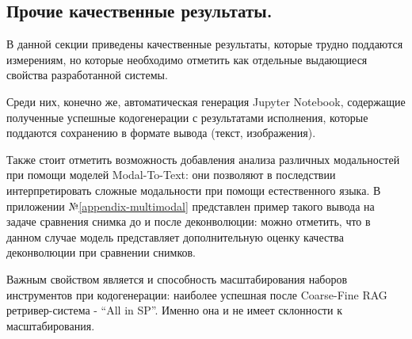 \subsection{Прочие качественные результаты.} \label{ch4:sec1:subsec5}

В данной секции приведены качественные результаты, которые трудно поддаются измерениям, но которые
необходимо отметить как отдельные выдающиеся свойства разработанной системы.

Среди них, конечно же, автоматическая генерация Jupyter Notebook, содержащие полученные успешные кодогенерации
с результатами исполнения, которые поддаются сохранению в формате вывода (текст, изображения).

Также стоит отметить возможность добавления анализа различных модальностей при помощи моделей Modal-To-Text:
они позволяют в последствии интерпретировать сложные модальности при помощи естественного языка.
В приложении №\ref{appendix-multimodal} представлен пример такого вывода на задаче сравнения снимка до и после
деконволюции: можно отметить, что в данном случае модель представляет дополнительную оценку 
качества деконволюции при сравнении снимков.

Важным свойством является и способность масштабирования наборов инструментов при кодогенерации: наиболее успешная
после Coarse-Fine RAG ретривер-система - ``All in SP''. Именно она и не имеет склонности к масштабирования.